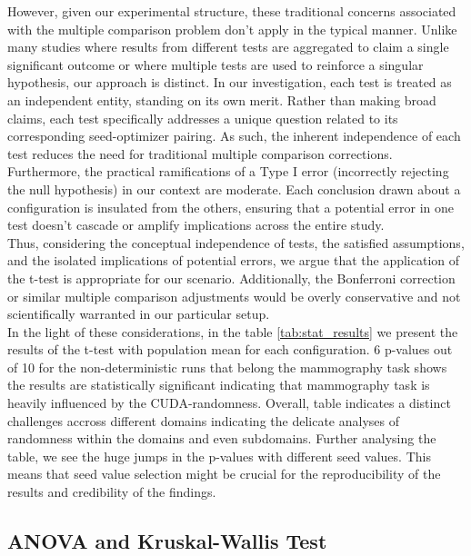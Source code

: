 However, given our experimental structure, these traditional concerns associated with the multiple comparison problem don't apply in the typical manner. Unlike many studies where results from different tests are aggregated to claim a single significant outcome or where multiple tests are used to reinforce a singular hypothesis, our approach is distinct. In our investigation, each test is treated as an independent entity, standing on its own merit. Rather than making broad claims, each test specifically addresses a unique question related to its corresponding seed-optimizer pairing. As such, the inherent independence of each test reduces the need for traditional multiple comparison corrections.\\

Furthermore, the practical ramifications of a Type I error (incorrectly rejecting the null hypothesis) in our context are moderate. Each conclusion drawn about a configuration is insulated from the others, ensuring that a potential error in one test doesn't cascade or amplify implications across the entire study.\\

Thus, considering the conceptual independence of tests, the satisfied assumptions, and the isolated implications of potential errors, we argue that the application of the t-test is appropriate for our scenario. Additionally, the Bonferroni correction or similar multiple comparison adjustments would be overly conservative and not scientifically warranted in our particular setup.\\

In the light of these considerations, in the table \ref{tab:stat_results} we present the results of the t-test with population mean for each configuration. 6 p-values out of 10 for the non-deterministic runs that belong the mammography task shows the results are statistically significant indicating that mammography task is heavily influenced by the CUDA-randomness. 
Overall, table indicates a distinct challenges accross different domains indicating the delicate analyses of randomness within the domains and even subdomains. Further analysing the table, we see the huge jumps in the p-values with different seed values. This means that seed value selection might be crucial for the reproducibility of the results and credibility of the findings.\\

\subsection*{ANOVA and Kruskal-Wallis Test}

